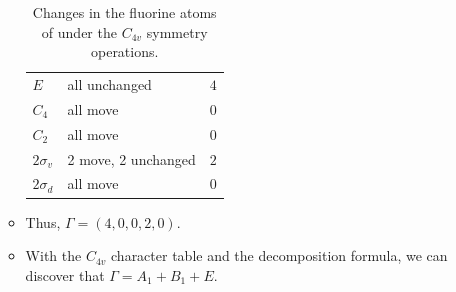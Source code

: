 \documentclass[../notes.tex]{subfiles}
\begin{document}
\begin{itemize}
\begin{itemize}
        \begin{table}[H]
            \centering
            \begin{tabular}{lll}
                $E$ & all unchanged & $4$\\
                $C_4$ & all move & $0$\\
                $C_2$ & all move & $0$\\
                $2\sigma_v$ & 2 move, 2 unchanged & $2$\\
                $2\sigma_d$ & all move & $0$\\
            \end{tabular}
            \caption{Changes in the fluorine atoms of  under the $C_{4v}$ symmetry operations.}
            \label{tab:XeOF4-operationResults}
        \end{table}
        \item Thus, $\Gamma=(4,0,0,2,0)$.
        \item With the $C_{4v}$ character table and the decomposition formula, we can discover that $\Gamma=A_1+B_1+E$.
    \end{itemize}
\end{itemize}
\end{document}
